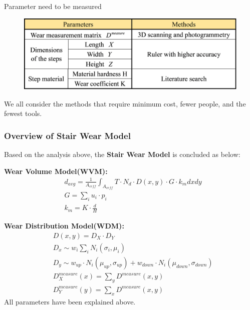 \documentclass[12pt]{article}  %
\numberwithin{equation}{section} %
\begin{document}
\begin{table}[H]
    \centering
    \vspace{-1.0em}
    \caption{Parameter need to be measured}
    \vspace{-1.0em}
        \begin{figure}[H]
    	\centering
    	\includegraphics[width=0.8\linewidth]{美赛Latex模板/parametertable.png}
        \end{figure}
    \label{parametertable}
\end{table}


\vspace{-2.0em}
We all consider the methods that require minimum cost, fewer people, and the fewest tools.
\subsubsection{Overview of Stair Wear Model}
Based on the analysis above, the\textbf{ Stair Wear Model }is concluded as below:

\textbf{Wear Volume Model(WVM):}\\
\begin{equation}
\begin{aligned}
    & d_{avg} = \frac{1}{A_{ceff}}\int_{A_{ceff}} T\cdot{N_d}\cdot{D(x,y)}\cdot{G}\cdot{k_m}dxdy\\
    & G=\sum_{i}u_i\cdot{p_i}\\
    & k_m = K\cdot{\frac{d}{H}}
\end{aligned}
\label{MVM}
\end{equation}

\textbf{Wear Distribution Model(WDM):}\\
\begin{equation}
\begin{aligned}
    & D(x,y)=D_X\cdot{D_Y} \\
    & D_{x}\sim w_i\sum_{i}N_i(\sigma_i,\mu_i)\\
    & D_{y}\sim w_{up}\cdot 
      N_i(\mu_{up},\sigma_{up})+w_{down}\cdot N_i(\mu_{down},\sigma_{down})\\
    & D_X^{measure}(x)=\sum_y{D^{measure}(x,y)}\\
    & D_Y^{measure}(y)=\sum_x{D^{measure}(x,y)}
\end{aligned}
\end{equation}
All parameters have been explained above.
\end{document}
